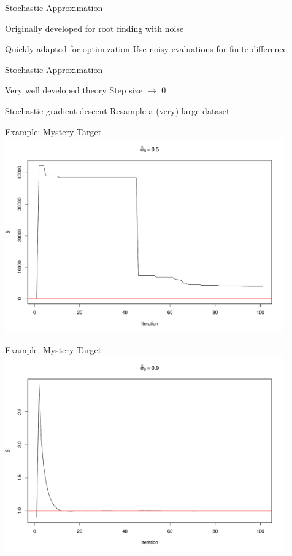 \documentclass[14pt]{beamer}
\begin{document}
\begin{frame}{Stochastic Approximation}
    \begin{outline}
        \1 Originally developed for root finding with noise
            \2 \citep{Rob51} \newline

        \1 Quickly adapted for optimization
            \2 Use noisy evaluations for finite difference
            \2 \citep{Kie52} 
    \end{outline}
\end{frame}

\begin{frame}{Stochastic Approximation}
    \begin{outline}
        \1 Very well developed theory
        \1 Step size $\rightarrow$ 0 \newline

        \1 Stochastic gradient descent
            \2 Resample a (very) large dataset

    \end{outline}
\end{frame}

\begin{frame}{Example: Mystery Target}
    \centering
    \includegraphics[height=0.9\textheight, width=0.9\textwidth, keepaspectratio]{Figures/ESS Traj - 0,5.pdf}
\end{frame}

\begin{frame}{Example: Mystery Target}
    \centering
    \includegraphics[height=0.9\textheight, width=0.9\textwidth, keepaspectratio]{Figures/ESS Traj - 0,9.pdf}
\end{frame}
\end{document}
